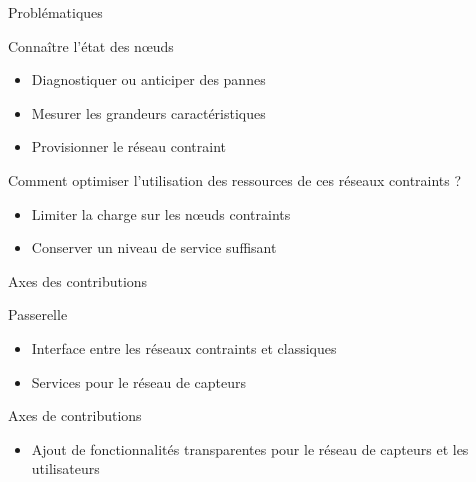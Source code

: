 \begin{frame}{Problématiques}
  \begin{block}{Connaître l'état des nœuds}
    \begin{itemize}
      \item Diagnostiquer ou anticiper des pannes
      \item Mesurer les grandeurs caractéristiques
      \item Provisionner le réseau contraint
    \end{itemize}
  \end{block}

  \begin{block}{Comment optimiser l'utilisation des ressources de ces réseaux contraints ?}
    \begin{itemize}
      \item Limiter la charge sur les nœuds contraints
      \item Conserver un niveau de service suffisant
    \end{itemize}
  \end{block}

\end{frame}

\begin{frame}{Axes des contributions}
  \begin{block}{Passerelle}
    \begin{itemize}
      \item Interface entre les réseaux contraints et classiques
      \item Services pour le réseau de capteurs
    \end{itemize}
  \end{block}

  \begin{alertblock}{Axes de contributions}
    \begin{itemize}
      \item Ajout de fonctionnalités transparentes pour le réseau de capteurs et les utilisateurs
    \end{itemize}
  \end{alertblock}



\end{frame}
